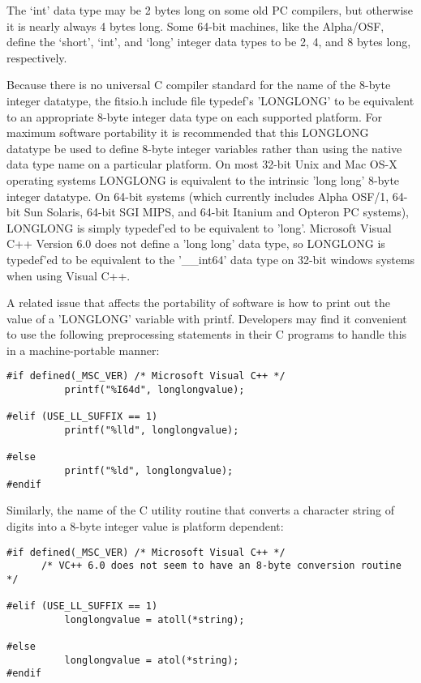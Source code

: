 \documentclass[11pt]{book}
\begin{document}
The `int' data type may be 2 bytes long on some old PC compilers,
but otherwise it is nearly always 4 bytes long.   Some 64-bit
machines, like the Alpha/OSF, define the `short', `int',
and `long' integer data types to be 2, 4, and 8 bytes long,
respectively.

Because there is no universal C compiler standard for the name of the
8-byte integer datatype, the fitsio.h include file typedef's
'LONGLONG'  to be equivalent to  an
appropriate 8-byte integer data type on each supported platform.
For maximum software portability it is recommended that
this LONGLONG datatype be used to define 8-byte integer variables
rather than using the native data type name on a particular
platform. On most
32-bit Unix and Mac OS-X operating systems LONGLONG is equivalent to the
intrinsic 'long long' 8-byte integer datatype.  On 64-bit systems (which currently
includes Alpha OSF/1, 64-bit Sun Solaris, 64-bit SGI MIPS, and  64-bit
Itanium and Opteron PC systems), LONGLONG is  simply typedef'ed to be
equivalent to 'long'.   Microsoft Visual C++ Version 6.0 does not define
a 'long long'  data type, so LONGLONG is typedef'ed to be equivalent to
the '\_\_int64' data type on 32-bit windows systems when using Visual C++.

A related issue that affects the portability of software is how to print
out the value of a 'LONGLONG' variable with printf.  Developers may
find it convenient to use the following preprocessing statements
in their C programs to handle this in a machine-portable manner:


\begin{verbatim}
#if defined(_MSC_VER) /* Microsoft Visual C++ */
          printf("%I64d", longlongvalue);
	
#elif (USE_LL_SUFFIX == 1)
          printf("%lld", longlongvalue);
	
#else
          printf("%ld", longlongvalue);
#endif
\end{verbatim}

Similarly, the name of the C utility routine that converts a character
string of digits into a 8-byte integer value is platform dependent:


\begin{verbatim}
#if defined(_MSC_VER) /* Microsoft Visual C++ */
      /* VC++ 6.0 does not seem to have an 8-byte conversion routine */
	
#elif (USE_LL_SUFFIX == 1)
          longlongvalue = atoll(*string);
	
#else
          longlongvalue = atol(*string);
#endif
\end{verbatim}
\end{document}
